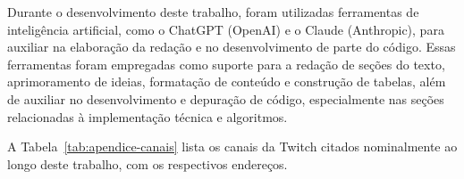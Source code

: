\documentclass{eic-bcc-tcc}
\begin{document}
Durante o desenvolvimento deste trabalho, foram utilizadas ferramentas de inteligência artificial, como o ChatGPT (OpenAI) e o Claude (Anthropic), para auxiliar na elaboração da redação e no desenvolvimento de parte do código. Essas ferramentas foram empregadas como suporte para a redação de seções do texto, aprimoramento de ideias, formatação de conteúdo e construção de tabelas, além de auxiliar no desenvolvimento e depuração de código, especialmente nas seções relacionadas à implementação técnica e algoritmos.

\backmatter

\label{apendice:canais}

A Tabela~\ref{tab:apendice-canais} lista os canais da Twitch citados nominalmente ao longo deste trabalho, com os respectivos endereços.
\end{document}
